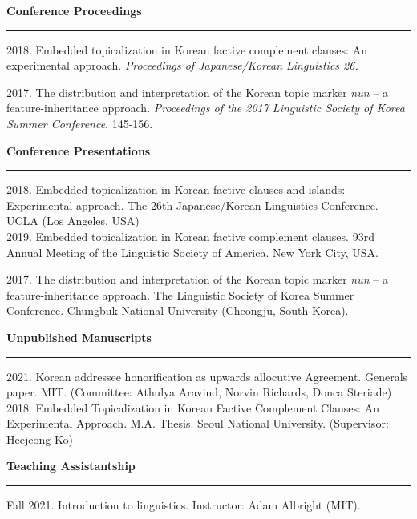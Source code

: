 \documentclass[12pt]{article}
\newcommand{\sect}[1]{{\fontsize{15}{30}\selectfont \textbf{#1}} {\vspace{0.1cm}} \hrule {\vspace{0.3cm}}}
\begin{document}

{\vspace{1cm}}

\sect{Conference Proceedings}

{2018. Embedded topicalization in Korean factive complement clauses: An experimental approach. \textit{Proceedings of Japanese/Korean Linguistics 26.}}\\

{2017. The distribution and interpretation of the Korean topic marker \textit{nun} -- a feature-inheritance approach. \textit{Proceedings of the 2017 Linguistic Society of Korea Summer Conference}. 145-156.

{\vspace{1cm}}

\sect{Conference Presentations}

{2018. Embedded topicalization in Korean factive clauses and islands: Experimental approach. The 26th Japanese/Korean Linguistics Conference. UCLA (Los Angeles, USA)}\\

{2019. Embedded topicalization in Korean factive complement clauses. 93rd Annual Meeting of the Linguistic Society of America. New York City, USA.}\\

{2017. The distribution and interpretation of the Korean topic marker \textit{nun} -- a feature-inheritance approach. The Linguistic Society of Korea Summer Conference. Chungbuk National University (Cheongju, South Korea).

{\vspace{1cm}}

\sect{Unpublished Manuscripts}

2021. Korean addressee honorification as upwards allocutive Agreement. Generals paper. MIT. (Committee: Athulya Aravind, Norvin Richards, Donca Steriade)\\

2018. Embedded Topicalization in Korean Factive Complement Clauses: An Experimental Approach. M.A. Thesis. Seoul National University. (Supervisor: Heejeong Ko)

{\vspace{1cm}}

\sect{Teaching Assistantship}

Fall 2021. Introduction to linguistics. Instructor: Adam Albright (MIT).

{\vspace{1cm}}

}}
\end{document}
